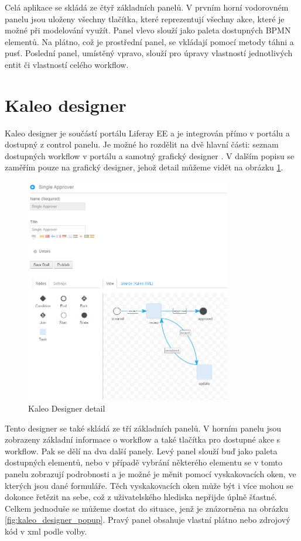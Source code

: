 \documentclass{fithesis}
\begin{document}
Celá aplikace se skládá ze čtyř základních panelů. V prvním horní vodorovném panelu jsou uloženy všechny tlačítka, které reprezentují všechny akce, které je možné při modelování využít. Panel vlevo slouží jako paleta dostupných BPMN elementů. Na plátno, což je prostřední panel, se vkládají pomocí metody táhni a pusť. Poslední panel, umístěný vpravo, slouží pro úpravy vlastností jednotlivých entit či vlastností celého workflow.

\section{Kaleo designer}
Kaleo designer je součástí portálu Liferay EE a je integrován přímo v portálu a dostupný z control panelu. Je možné ho rozdělit na dvě hlavní části: seznam dostupných workflow v portálu a samotný grafický designer . V dalším popisu se zaměřím pouze na grafický designer, jehož detail můžeme vidět na obrázku \ref{fig:kaleo_designer}.

\begin{figure}[htp]
\centering
\includegraphics[width=340px]{images/kaleo_designer_detail.png}
\caption{Kaleo Designer detail}
\label{fig:kaleo_designer}
\end{figure}

Tento designer se také skládá ze tří základních panelů. V horním panelu jsou zobrazeny základní informace o workflow a také tlačítka pro dostupné akce s workflow. Pak se dělí na dva další panely. Levý panel slouží buď jako paleta dostupných elementů, nebo v případě vybrání některého elementu se v tomto panelu zobrazují podrobnosti a je možné je měnit pomocí vyskakovacích oken, ve kterých jsou dané formuláře. Těch vyskakovacích oken může být i více mohou se dokonce řetězit na sebe, což z uživatelského hlediska nepřijde úplně šťastné. Celkem jednoduše se můžeme dostat do situace, jenž je znázorněna na obrázku \ref{fig:kaleo_designer_popup}.  Pravý panel obsahuje vlastní plátno nebo zdrojový kód v xml podle volby.
\end{document}
